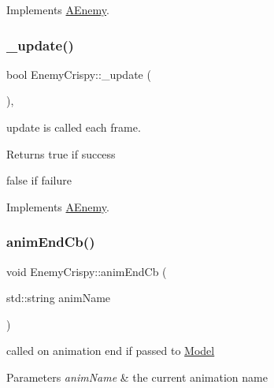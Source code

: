 Implements \hyperlink{class_a_enemy_a78b010638f552c4ab11ff71e7b826b1b}{A\+Enemy}.

\mbox{\label{class_enemy_crispy_ad48755d398b40e0000806a89025802a1}} 
\subsubsection{\texorpdfstring{\+\_\+update()}{\_update()}}
{\footnotesize\ttfamily bool Enemy\+Crispy\+::\+\_\+update (\begin{DoxyParamCaption}{ }\end{DoxyParamCaption})\hspace{0.3cm}{\ttfamily [protected]}, {\ttfamily [virtual]}}



update is called each frame. 

\begin{DoxyReturn}{Returns}
true if success 

false if failure 
\end{DoxyReturn}


Implements \hyperlink{class_a_enemy_abefc22131eb1c618819c67c3c1415c08}{A\+Enemy}.

\mbox{\label{class_enemy_crispy_a32d938b70f4b0f2bd2e1df606c812d13}} 
\subsubsection{\texorpdfstring{anim\+End\+Cb()}{animEndCb()}}
{\footnotesize\ttfamily void Enemy\+Crispy\+::anim\+End\+Cb (\begin{DoxyParamCaption}\item[{std\+::string}]{anim\+Name }\end{DoxyParamCaption})\hspace{0.3cm}{\ttfamily [virtual]}}



called on animation end if passed to \hyperlink{class_model}{Model} 


\begin{DoxyParams}{Parameters}
{\em anim\+Name} & the current animation name \\
\hline
\end{DoxyParams}



